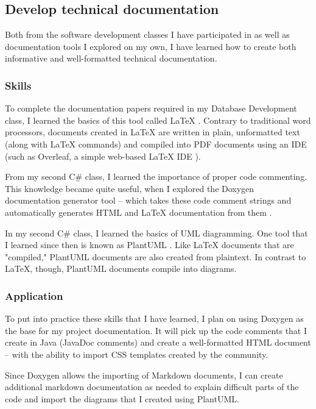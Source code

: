 \documentclass[letterpaper,11pt]{../templates/texMemo}
\begin{document}
    \subsection{Develop technical documentation}
    Both from the software development classes I have participated in as well as documentation tools I explored on my own, I have learned how to create both informative and well-formatted technical documentation.

    \subsubsection{Skills}
    To complete the documentation papers required in my Database Development class, I learned the basics of this tool called {\LaTeX} \parencite{latex_website_2022}. Contrary to traditional word processors, documents created in {\LaTeX} are written in plain, unformatted text (along with {\LaTeX} commands) and compiled into PDF documents using an IDE (such as Overleaf, a simple web-based {\LaTeX} IDE \parencite{overleaf_website_2022}).

    From my second C\# class, I learned the importance of proper code commenting. This knowledge became quite useful, when I explored the Doxygen documentation generator tool -- which takes these code comment strings and automatically generates HTML and {\LaTeX} documentation from them \parencite{doxygen_website_2022}.

    In my second C\# class, I learned the basics of UML diagramming. One tool that I learned since then is known as PlantUML \parencite{plantuml_website_2022}. Like {\LaTeX} documents that are "compiled," PlantUML documents are also created from plaintext. In contrast to {\LaTeX}, though, PlantUML documents compile into diagrams.

    \subsubsection{Application}
    To put into practice these skills that I have learned, I plan on using Doxygen as the base for my project documentation. It will pick up the code comments that I create in Java (JavaDoc comments) and create a well-formatted HTML document -- with the ability to import CSS templates created by the community.

    Since Doxygen allows the importing of Markdown documents, I can create additional markdown documentation as needed to explain difficult parts of the code and import the diagrams that I created using PlantUML.
\end{document}
